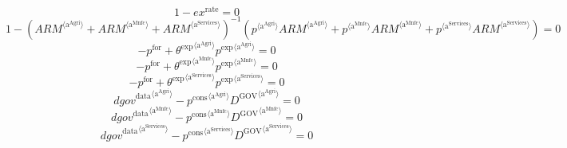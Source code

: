 \begin{equation}
1 - {e\!x}^{\mathrm{rate}} = 0
\end{equation}
\begin{equation}
1 - \left({{A\!R\!M}}^{\langle \mathrm{a}^{\mathrm{Agri}}\rangle} + {{A\!R\!M}}^{\langle \mathrm{a}^{\mathrm{Mnfc}}\rangle} + {{A\!R\!M}}^{\langle \mathrm{a}^{\mathrm{Services}}\rangle}\right)^{-1} \left({{p}^{\langle \mathrm{a}^{\mathrm{Agri}}\rangle}} {{{A\!R\!M}}^{\langle \mathrm{a}^{\mathrm{Agri}}\rangle}} + {{p}^{\langle \mathrm{a}^{\mathrm{Mnfc}}\rangle}} {{{A\!R\!M}}^{\langle \mathrm{a}^{\mathrm{Mnfc}}\rangle}} + {{p}^{\langle \mathrm{a}^{\mathrm{Services}}\rangle}} {{{A\!R\!M}}^{\langle \mathrm{a}^{\mathrm{Services}}\rangle}}\right) = 0
\end{equation}
\begin{equation}
-p^{\mathrm{for}} + {{\theta^{\mathrm{exp}}}^{\langle \mathrm{\mathrm{a}^{\mathrm{Agri}}}\rangle}} {{p^{\mathrm{exp}}}^{\langle \mathrm{a}^{\mathrm{Agri}}\rangle}} = 0
\end{equation}
\begin{equation}
-p^{\mathrm{for}} + {{\theta^{\mathrm{exp}}}^{\langle \mathrm{\mathrm{a}^{\mathrm{Mnfc}}}\rangle}} {{p^{\mathrm{exp}}}^{\langle \mathrm{a}^{\mathrm{Mnfc}}\rangle}} = 0
\end{equation}
\begin{equation}
-p^{\mathrm{for}} + {{\theta^{\mathrm{exp}}}^{\langle \mathrm{\mathrm{a}^{\mathrm{Services}}}\rangle}} {{p^{\mathrm{exp}}}^{\langle \mathrm{a}^{\mathrm{Services}}\rangle}} = 0
\end{equation}
\begin{equation}
{{d\!g\!o\!v}^{\mathrm{data}}}^{\langle \mathrm{\mathrm{a}^{\mathrm{Agri}}}\rangle} - {{p^{\mathrm{cons}}}^{\langle \mathrm{a}^{\mathrm{Agri}}\rangle}} {{D^{\mathrm{GOV}}}^{\langle \mathrm{a}^{\mathrm{Agri}}\rangle}} = 0
\end{equation}
\begin{equation}
{{d\!g\!o\!v}^{\mathrm{data}}}^{\langle \mathrm{\mathrm{a}^{\mathrm{Mnfc}}}\rangle} - {{p^{\mathrm{cons}}}^{\langle \mathrm{a}^{\mathrm{Mnfc}}\rangle}} {{D^{\mathrm{GOV}}}^{\langle \mathrm{a}^{\mathrm{Mnfc}}\rangle}} = 0
\end{equation}
\begin{equation}
{{d\!g\!o\!v}^{\mathrm{data}}}^{\langle \mathrm{\mathrm{a}^{\mathrm{Services}}}\rangle} - {{p^{\mathrm{cons}}}^{\langle \mathrm{a}^{\mathrm{Services}}\rangle}} {{D^{\mathrm{GOV}}}^{\langle \mathrm{a}^{\mathrm{Services}}\rangle}} = 0
\end{equation}
